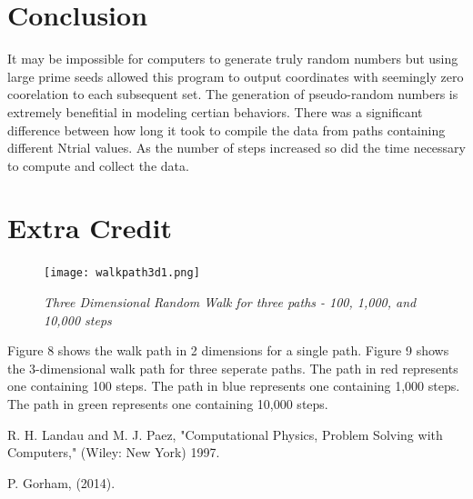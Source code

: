 \documentclass[11pt]{article}
\begin{document}
\section{Conclusion}

It may be impossible for computers to generate truly random numbers but using large prime seeds allowed 
this program to output coordinates with seemingly zero coorelation to each subsequent set.  The generation 
of pseudo-random numbers is extremely benefitial in modeling certian behaviors.  There was a significant 
difference between how long it took to compile the data from paths containing different Ntrial values.  
As the number of steps increased so did the time necessary to compute and collect the data.


\section{Extra Credit}

\begin{figure}[H]
  \begin{center}
\centerline{\texttt{[image: walkpath3d1.png]}}
\caption{\it \small{Three Dimensional Random Walk for three paths - 100, 1,000, and 10,000 steps \label{fig7}}}
  \end{center}
\end{figure}

Figure 8 shows the walk path in 2 dimensions for a single path.  Figure 9 shows the 3-dimensional walk path for
three seperate paths.  The path in red represents one containing 100 steps.  The path in blue represents one 
containing 1,000 steps.  The path in green represents one containing 10,000 steps.

\setlength{\parindent}{0cm}

\begin{thebibliography}{99}  %

 R. H. Landau and M. J. Paez, "Computational Physics, Problem Solving with Computers,"
(Wiley: New York) 1997.

 P. Gorham, (2014).
\end{thebibliography}
\end{document}

